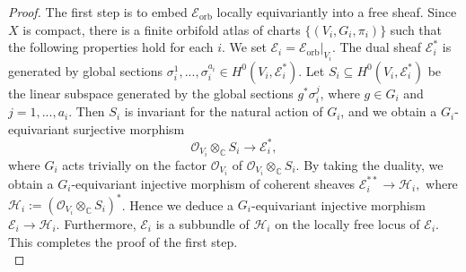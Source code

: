 \documentclass[12pt]{amsart}
\newcommand{\<}{\leq}
\def\mcO{\mathcal{O}}
\def\mcE{\mathcal{E}}
\def\mcH{\mathcal{H}}
\def\mcN{\mathcal{N}}
\theoremstyle{remark}
\theoremstyle{definition}
\theoremstyle{definition}
\numberwithin{equation}{section}
\theoremstyle{definition}
\theoremstyle{definition}
\def\orb{\mathrm{orb}}
\begin{document}
\begin{proof}   
The first step is to embed  $\mcE_{\orb}$ locally equivariantly into a free sheaf. 
Since $X$ is compact, there is a finite orbifold atlas  of charts $\{(V_i,G_i,\pi_i)\}$ such that the following properties hold for each $i$. 
We set  $\mcE_i = \mcE_{\orb} |_{V_i} $. 
The dual sheaf $\mcE_i^*$ is generated by global sections $\sigma_{i}^1,...,\sigma_i^{a_i} \in H^0(V_i, \mcE_i^*)$. 
Let $S_i \subseteq H^0(V_i,\mcE_i^*)$ be the linear subspace generated by the global sections $g^*\sigma_i^j$, where $g\in G_i$ and $j=1,...,a_i$. 
Then $S_i$ is invariant for the natural action of $G_i$, and we obtain a  $G_i$-equivariant surjective morphism 
\[ \mcO_{V_i} \otimes_{\mathbb{C}} S_i  \to\mcE_i^*,\] 
where  $G_i$ acts trivially on the factor $\mcO_{V_i}$ of $ \mcO_{V_i} \otimes_{\mathbb{C}} S_i$.  
By taking the duality, we obtain a  $G_i$-equivariant  injective morphism of coherent sheaves 
$
\mcE_i^{**} \to \mcH_i,
$
where $\mcH_i := (\mcO_{V_i} \otimes_{\mathbb{C}} S_i )^*$.  
Hence we deduce a  $G_i$-equivariant  injective morphism $\mcE_i \to \mcH_i$. 
Furthermore, $\mcE_i$ is a subbundle of $\mcH_i$ on the locally free locus of $\mcE_i$.
This completes the proof of the first step. \\





\end{proof}
\end{document}

